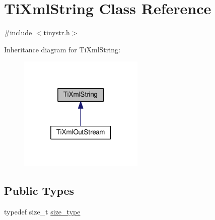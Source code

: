 \hypertarget{class_ti_xml_string}{}\section{Ti\+Xml\+String Class Reference}
\label{class_ti_xml_string}


{\ttfamily \#include $<$tinystr.\+h$>$}



Inheritance diagram for Ti\+Xml\+String\+:
\nopagebreak
\begin{figure}[H]
\begin{center}
\leavevmode
\includegraphics[width=169pt]{class_ti_xml_string__inherit__graph}
\end{center}
\end{figure}
\subsection*{Public Types}
\begin{DoxyCompactItemize}
\item 
typedef size\+\_\+t \hyperlink{class_ti_xml_string_abeb2c1893a04c17904f7c06546d0b971}{size\+\_\+type}
\end{DoxyCompactItemize}
